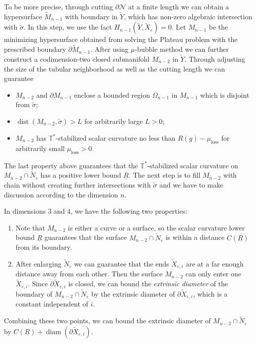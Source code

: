 \documentclass[11pt, reqno]{amsart}
\numberwithin{equation}{section}
\theoremstyle{definition}
\DeclareMathOperator{\dist}{dist}
\DeclareMathOperator{\diam}{diam}
\newcommand{\ve}{\varepsilon}
\newcommand{\ti}[1]{\tilde{#1}}
\begin{document}
To be more precise, through cutting $\partial \mathcal N$ at a finite length we can obtain a hypersurface $\tilde M_{n-1}$ with boundary in $\tilde Y$, which has non-zero algebraic intersection with $\tilde\sigma$.
In this step, we use the fact $H_{n-1}(\tilde Y, \ti X_{\ve}) = 0$. Let $M_{n-1}$ be the minimizing hypersurface obtained from solving the Plateau problem with the prescribed boundary $\partial\tilde M_{n-1}$. After using $\mu$-bubble method we can further construct a codimension-two closed submanifold $M_{n-2}$ in $\tilde Y$. Through adjusting the size of the tubular neighborhood as well as the cutting length we can guarantee
\begin{itemize}\setlength{\itemsep}{1mm}
\item $M_{n-2}$ and $\partial M_{n-1}$ enclose a bounded region $\Omega_{n-1}$ in $M_{n-1}$ which is disjoint from $\tilde\sigma$;
\item $\dist(M_{n-2},\tilde \sigma)>L$ for arbitrarily large $L>0$;
\item $M_{n-2}$ has $\mathbb{T}^{*}$-stabilized scalar curvature no less than $R(g)-\mu_{\mathrm{loss}}$ for arbitrarily small $\mu_{\mathrm{loss}}>0$.
\end{itemize}
The last property above guarantees that the $\mathbb{T}^{*}$-stabilized scalar curvature on $M_{n-2} \cap \ti N_\ve$ has a positive lower bound $\underline{R}$. The next step is to fill $M_{n-2}$ with chain without creating further intersections with $\tilde \sigma$ and we have to make discussion according to the dimension $n$.

In dimensions 3 and 4, we have the following two properties:
\begin{enumerate}
\item Note that $M_{n-2}$ is either a curve or a surface, so the scalar curvature lower bound $\underline R$ guarantees that the surface $M_{n-2}  \cap \ti N_\ve$ is within a distance $C(\underline{R})$ from its boundary.
\item
After enlarging $\tilde N_{\ve}$ we can guarantee that the ends $\tilde X_{\ve,i}$ are at a far enough distance away from each other. Then the surface $M_{n-2}$ can only enter one $\ti X_{\ve, i}$. Since $\partial \ti X_{\ve, i}$ is closed, we can bound the \emph{extrinsic diameter} of the boundary of $M_{n-2} \cap \ti N_\ve$ by the extrinsic diameter of $\partial \ti X_{\ve, i}$, which is a constant independent of $i$.
\end{enumerate}
Combining these two points, we can bound the extrinsic diameter of $M_{n-2} \cap \ti N_\ve$ by $C(\underline{R}) + \diam (\partial \tilde X_{\ve,i})$.
\end{document}
